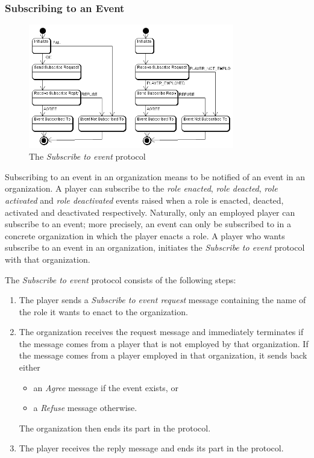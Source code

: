 \subsubsection{Subscribing to an Event}

\begin{figure}[ht]
	\centering
	\includegraphics[width=0.8\textwidth]{images/thespian/subscribe-to-event-protocol.png}
	\caption{The \textit{Subscribe to event} protocol}
	\label{figure:thespian-subscribe-to-event-protocol}
\end{figure}

Subscribing to an event in an organization means to be notified of an event in an organization.
A player can subscribe to the \textit{role enacted}, \textit{role deacted}, \textit{role activated} and \textit{role deactivated} events raised when a role is enacted, deacted, activated and deactivated respectively.
Naturally, only an employed player can subscribe to an event; more precisely, an event can only be subscribed to in a concrete organization in which the player enacts a role.
A player who wants subscribe to an event in an organization, initiates the \textit{Subscribe to event} protocol with that organization.

The \textit{Subscribe to event} protocol consists of the following steps:
\begin{enumerate}
	\item The player sends a \textit{Subscribe to event request} message containing the name of the role it wants to enact to the organization.
	\item The organization receives the request message and immediately terminates if the message comes from a player that is not employed by that organization.
	If the message comes from a player employed in that organization, it sends back either
	\begin{itemize}
		\item an \textit{Agree} message if the event exists, or
		\item a \textit{Refuse} message otherwise. 
	\end{itemize}
	The organization then ends its part in the protocol.
	\item The player receives the reply message and ends its part in the protocol.
\end{enumerate}

